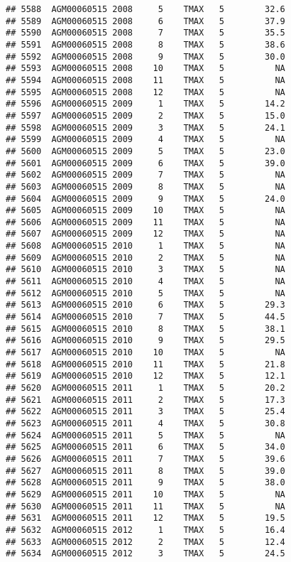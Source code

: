 \documentclass{article}\usepackage[]{graphicx}\usepackage[]{color}
\makeatletter
\newenvironment{kframe}{%
 \def\at@end@of@kframe{}%
 \ifinner\ifhmode%
  \def\at@end@of@kframe{\end{minipage}}%
  \begin{minipage}{\columnwidth}%
 \fi\fi%
 \def\FrameCommand##1{\hskip\@totalleftmargin \hskip-\fboxsep
 \colorbox{shadecolor}{##1}\hskip-\fboxsep
     \hskip-\linewidth \hskip-\@totalleftmargin \hskip\columnwidth}%
 \MakeFramed {\advance\hsize-\width
   \@totalleftmargin\z@ \linewidth\hsize
   \@setminipage}}%
 {\par\unskip\endMakeFramed%
 \at@end@of@kframe}
\newenvironment{knitrout}{}{} %
\makeatother
\begin{document}
\begin{knitrout}
\begin{kframe}
\begin{verbatim}
## 5588  AGM00060515 2008     5    TMAX   5        32.6
## 5589  AGM00060515 2008     6    TMAX   5        37.9
## 5590  AGM00060515 2008     7    TMAX   5        35.5
## 5591  AGM00060515 2008     8    TMAX   5        38.6
## 5592  AGM00060515 2008     9    TMAX   5        30.0
## 5593  AGM00060515 2008    10    TMAX   5          NA
## 5594  AGM00060515 2008    11    TMAX   5          NA
## 5595  AGM00060515 2008    12    TMAX   5          NA
## 5596  AGM00060515 2009     1    TMAX   5        14.2
## 5597  AGM00060515 2009     2    TMAX   5        15.0
## 5598  AGM00060515 2009     3    TMAX   5        24.1
## 5599  AGM00060515 2009     4    TMAX   5          NA
## 5600  AGM00060515 2009     5    TMAX   5        23.0
## 5601  AGM00060515 2009     6    TMAX   5        39.0
## 5602  AGM00060515 2009     7    TMAX   5          NA
## 5603  AGM00060515 2009     8    TMAX   5          NA
## 5604  AGM00060515 2009     9    TMAX   5        24.0
## 5605  AGM00060515 2009    10    TMAX   5          NA
## 5606  AGM00060515 2009    11    TMAX   5          NA
## 5607  AGM00060515 2009    12    TMAX   5          NA
## 5608  AGM00060515 2010     1    TMAX   5          NA
## 5609  AGM00060515 2010     2    TMAX   5          NA
## 5610  AGM00060515 2010     3    TMAX   5          NA
## 5611  AGM00060515 2010     4    TMAX   5          NA
## 5612  AGM00060515 2010     5    TMAX   5          NA
## 5613  AGM00060515 2010     6    TMAX   5        29.3
## 5614  AGM00060515 2010     7    TMAX   5        44.5
## 5615  AGM00060515 2010     8    TMAX   5        38.1
## 5616  AGM00060515 2010     9    TMAX   5        29.5
## 5617  AGM00060515 2010    10    TMAX   5          NA
## 5618  AGM00060515 2010    11    TMAX   5        21.8
## 5619  AGM00060515 2010    12    TMAX   5        12.1
## 5620  AGM00060515 2011     1    TMAX   5        20.2
## 5621  AGM00060515 2011     2    TMAX   5        17.3
## 5622  AGM00060515 2011     3    TMAX   5        25.4
## 5623  AGM00060515 2011     4    TMAX   5        30.8
## 5624  AGM00060515 2011     5    TMAX   5          NA
## 5625  AGM00060515 2011     6    TMAX   5        34.0
## 5626  AGM00060515 2011     7    TMAX   5        39.6
## 5627  AGM00060515 2011     8    TMAX   5        39.0
## 5628  AGM00060515 2011     9    TMAX   5        38.0
## 5629  AGM00060515 2011    10    TMAX   5          NA
## 5630  AGM00060515 2011    11    TMAX   5          NA
## 5631  AGM00060515 2011    12    TMAX   5        19.5
## 5632  AGM00060515 2012     1    TMAX   5        16.4
## 5633  AGM00060515 2012     2    TMAX   5        12.4
## 5634  AGM00060515 2012     3    TMAX   5        24.5

\end{verbatim}
\end{kframe}
\end{knitrout}
\end{document}
